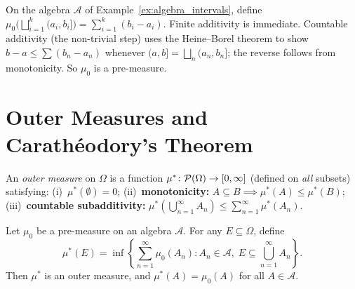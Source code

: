 \documentclass[11pt,a4paper]{article}
\begin{document}
\begin{example}
\label{ex:length_premeasure}
On the algebra $\mathcal{A}$ of Example~\ref{ex:algebra_intervals},
define $\mu_0\bigl(\bigsqcup_{i=1}^k (a_i, b_i]\bigr) = \sum_{i=1}^k
(b_i - a_i)$. Finite additivity is immediate. Countable additivity
(the non-trivial step) uses the Heine--Borel theorem to show
$b - a \leq \sum (b_n - a_n)$ whenever
$(a,b] = \bigsqcup_n (a_n, b_n]$; the reverse follows from
monotonicity. So $\mu_0$ is a pre-measure.
\end{example}


\section{Outer Measures and Carath\'{e}odory's Theorem}
\label{sec:caratheodory}

\begin{definition}
\label{def:outer_measure}
An \emph{outer measure} on $\Omega$ is a function
$\mu^*\colon \mathcal{P}(\Omega) \to [0, \infty]$ (defined on
\emph{all} subsets) satisfying: (i)~$\mu^*(\emptyset) = 0$;
(ii)~\textbf{monotonicity:}
$A \subseteq B \implies \mu^*(A) \leq \mu^*(B)$;
(iii)~\textbf{countable subadditivity:}
$\mu^*(\bigcup_{n=1}^\infty A_n) \leq \sum_{n=1}^\infty \mu^*(A_n)$.
\end{definition}

\begin{proposition}
\label{prop:induced_outer}
Let $\mu_0$ be a pre-measure on an algebra $\mathcal{A}$. For any
$E \subseteq \Omega$, define
\begin{equation}
  \mu^*(E) = \inf\left\{\sum_{n=1}^\infty \mu_0(A_n) :
    A_n \in \mathcal{A},\;
    E \subseteq \bigcup_{n=1}^\infty A_n\right\}.
  \label{eq:outer_measure}
\end{equation}
Then $\mu^*$ is an outer measure, and $\mu^*(A) = \mu_0(A)$ for all
$A \in \mathcal{A}$.
\end{proposition}
\end{document}
